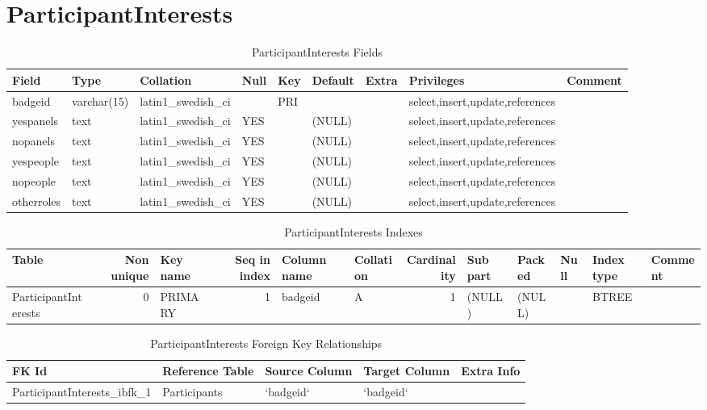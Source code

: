\documentclass[captions=tablesignature]{scrartcl}
\begin{document}
\section{ParticipantInterests}
\label{sec-8}

\begin{table}[htb]
\caption{\label{tbl:participantinterestsfields}ParticipantInterests Fields}
\centering
\begin{tabular}{lllllllll}
\hline
Field & Type & Collation & Null & Key & Default & Extra & Privileges & Comment\\
\hline
badgeid & varchar(15) & latin1\_swedish\_ci &  & PRI &  &  & select,insert,update,references & \\
yespanels & text & latin1\_swedish\_ci & YES &  & (NULL) &  & select,insert,update,references & \\
nopanels & text & latin1\_swedish\_ci & YES &  & (NULL) &  & select,insert,update,references & \\
yespeople & text & latin1\_swedish\_ci & YES &  & (NULL) &  & select,insert,update,references & \\
nopeople & text & latin1\_swedish\_ci & YES &  & (NULL) &  & select,insert,update,references & \\
otherroles & text & latin1\_swedish\_ci & YES &  & (NULL) &  & select,insert,update,references & \\
\hline
\end{tabular}
\end{table}

\begin{table}[htb]
\caption{\label{tbl:participantinterestesindexes}ParticipantInterests Indexes}
\centering
\begin{tabular}{lrlrllrlllll}
\hline
Table & Non unique & Key name & Seq in index & Column name & Collation & Cardinality & Sub part & Packed & Null & Index type & Comment\\
\hline
ParticipantInterests & 0 & PRIMARY & 1 & badgeid & A & 1 & (NULL) & (NULL) &  & BTREE & \\
\hline
\end{tabular}
\end{table}

\begin{table}[htb]
\caption{\label{tbl:participantinterestsfkr}ParticipantInterests Foreign Key Relationships}
\centering
\begin{tabular}{lllll}
\hline
FK Id & Reference Table & Source Column & Target Column & Extra Info\\
\hline
ParticipantInterests\_ibfk\_1 & Participants & `badgeid` & `badgeid` & \\
\hline
\end{tabular}
\end{table}
\end{document}
